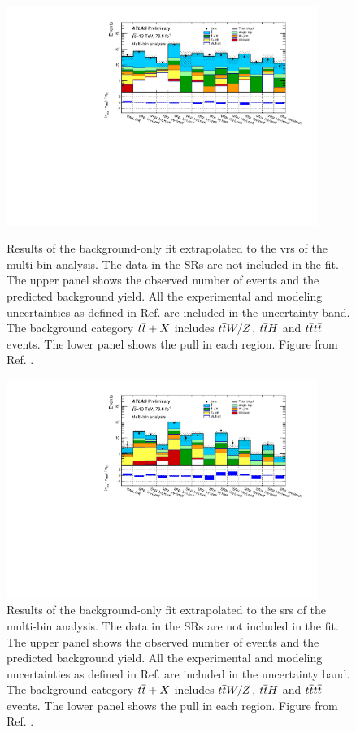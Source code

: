 \begin{figure}[htbp]
	\centering
	\includegraphics[width=0.9\textwidth]{figures/strong_prod/R21/multibin/histpull_grouping_VR.pdf}\\
	\caption{Results of the background-only fit extrapolated to the \glspl{vr} of the multi-bin analysis. 
	 The data in the  SRs are not included in the fit.  
	 The upper panel shows the observed number of events and the predicted background 
	yield. All the experimental and modeling uncertainties as defined in Ref. \cite{ATLAS-CONF-2018-041} are included in the uncertainty band. 
	The background 
	category $t\overline{t}+X$ includes $t\overline{t} W/Z$, $t\overline{t} H$ and $t\overline{t} t\overline{t}$ events. The lower panel shows the 
	pull in each region.
    Figure from Ref. \cite{ATLAS-CONF-2018-041}.	 }  
	\label{fig:pullVR_R21}
\end{figure}

\begin{figure}[htbp]
	\centering
    \includegraphics[width=0.9\textwidth]{figures/strong_prod/R21/multibin/histpull_grouping_SR.pdf}
	\caption{Results of the background-only fit extrapolated to the \glspl{sr}  of the multi-bin analysis. 
	 The data in the  SRs are not included in the fit.  
	 The upper panel shows the observed number of events and the predicted background 
	yield. All the experimental and modeling uncertainties as defined in Ref. \cite{ATLAS-CONF-2018-041} are included in the uncertainty band. 
	The background 
	category $t\overline{t}+X$ includes $t\overline{t} W/Z$, $t\overline{t} H$ and $t\overline{t} t\overline{t}$ events. The lower panel shows the 
	pull in each region.
    Figure from Ref. \cite{ATLAS-CONF-2018-041}.	 }  
	\label{fig:pullSR_R21}
\end{figure}

